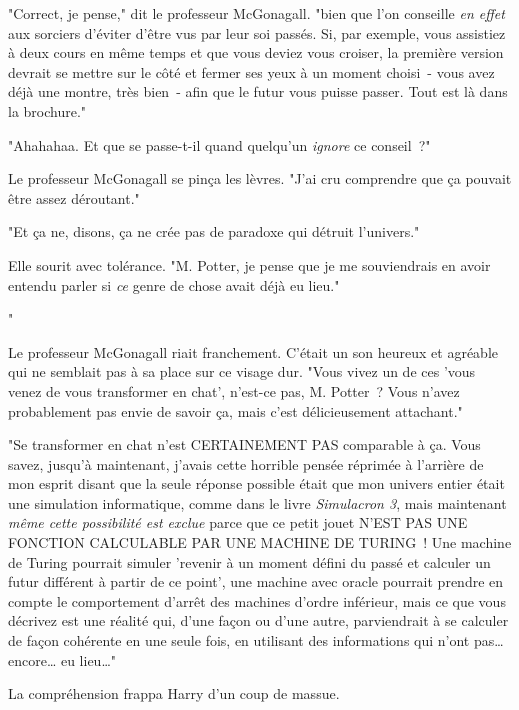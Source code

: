 "Correct, je pense," dit le professeur McGonagall. "bien que l'on conseille \emph{en effet} aux sorciers d'éviter d'être vus par leur soi passés. Si, par exemple, vous assistiez à deux cours en même temps et que vous deviez vous croiser, la première version devrait se mettre sur le côté et fermer ses yeux à un moment choisi~- vous avez déjà une montre, très bien~- afin que le futur vous puisse passer. Tout est là dans la brochure."

"Ahahahaa. Et que se passe-t-il quand quelqu'un \emph{ignore} ce conseil~?"

Le professeur McGonagall se pinça les lèvres. "J'ai cru comprendre que ça pouvait être assez déroutant."

"Et ça ne, disons, ça ne crée pas de paradoxe qui détruit l'univers."

Elle sourit avec tolérance. "M. Potter, je pense que je me souviendrais en avoir entendu parler si \emph{ce} genre de chose avait déjà eu lieu."

"

Le professeur McGonagall riait franchement. C'était un son heureux et agréable qui ne semblait pas à sa place sur ce visage dur. "Vous vivez un de ces 'vous venez de vous transformer en chat', n'est-ce pas, M. Potter~? Vous n'avez probablement pas envie de savoir ça, mais c'est délicieusement attachant."

"Se transformer en chat n'est CERTAINEMENT PAS comparable à ça. Vous savez, jusqu'à maintenant, j'avais cette horrible pensée réprimée à l'arrière de mon esprit disant que la seule réponse possible était que mon univers entier était une simulation informatique, comme dans le livre \emph{Simulacron 3}, mais maintenant \emph{même cette possibilité est exclue} parce que ce petit jouet N'EST PAS UNE FONCTION CALCULABLE PAR UNE MACHINE DE TURING~! Une machine de Turing pourrait simuler 'revenir à un moment défini du passé et calculer un futur différent à partir de ce point', une machine avec oracle pourrait prendre en compte le comportement d'arrêt des machines d'ordre inférieur, mais ce que vous décrivez est une réalité qui, d'une façon ou d'une autre, parviendrait à se calculer de façon cohérente en une seule fois, en utilisant des informations qui n'ont pas… encore… eu lieu…"

La compréhension frappa Harry d'un coup de massue.

